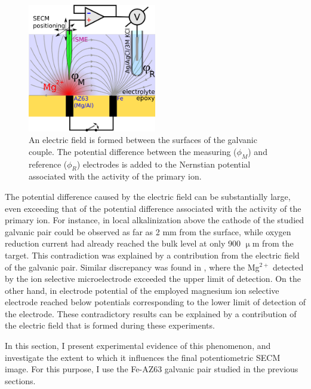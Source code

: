 \begin{figure}
\centering
\includegraphics[width=0.5\textwidth]{img/field/field.eps}
\caption{An electric field is formed between the surfaces of the galvanic couple. The potential difference between the measuring ($\phi_M$) and reference ($\phi_R$) electrodes is added to the Nernstian potential associated with the activity of the primary ion.}
\label{fig:field}
\end{figure}

The potential difference caused by the electric field can be substantially large, even exceeding that of the potential difference associated with the activity of the primary ion.
For instance, in \cite{11} local alkalinization above the cathode of the studied galvanic pair could be observed as far as 2 mm from the surface, while oxygen reduction current had already reached the bulk level at only 900 $\upmu$m from the target.
This contradiction was explained by a contribution from the electric field of the galvanic pair.
Similar discrepancy was found in \cite{12, 13, 14}, where the Mg$^{2+}$ detected by the ion selective microelectrode exceeded the upper limit of detection. On the other hand, in \cite{15} electrode potential of the employed magnesium ion selective electrode reached below potentials corresponding to the lower limit of detection of the electrode. These contradictory results can be explained by a contribution of the electric field that is formed during these experiments. 

In this section, I present experimental evidence of this phenomenon, and investigate the extent to which it influences the final potentiometric SECM image. For this purpose, I use the Fe-AZ63 galvanic pair studied in the previous sections.

